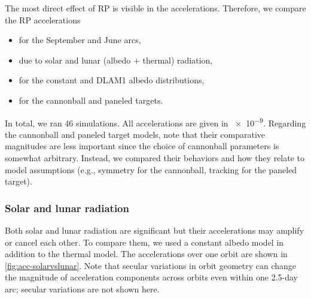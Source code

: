 The most direct effect of \gls{RP} is visible in the accelerations. Therefore, we compare the \gls{RP} accelerations
\begin{itemize}
    \item for the September and June arcs,
    \item due to solar and lunar (albedo + thermal) radiation,
    \item for the constant and \gls{DLAM1} albedo distributions,
    \item for the cannonball and paneled targets.
\end{itemize}
In total, we ran 46 simulations. All accelerations are given in \qty{e-9}{\acc}. Regarding the cannonball and paneled target models, note that their comparative magnitudes are less important since the choice of cannonball parameters is somewhat arbitrary. Instead, we compared their behaviors and how they relate to model assumptions (e.g., symmetry for the cannonball, tracking for the paneled target).


\subsubsection{Solar and lunar radiation}
Both solar and lunar radiation are significant but their accelerations may amplify or cancel each other. To compare them, we used a constant albedo model in addition to the thermal model. The accelerations over one orbit are shown in \cref{fig:acc-solarvslunar}. Note that secular variations in orbit geometry can change the magnitude of acceleration components across orbits even within one 2.5-day arc; secular variations are not shown here.

